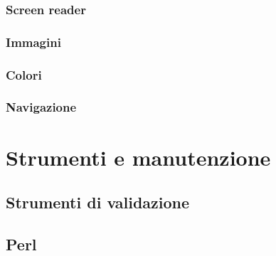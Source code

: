 		\subsubsection{Screen reader}
		
		\subsubsection{Immagini}
		
		\subsubsection{Colori}
		
		\subsubsection{Navigazione}
\section{Strumenti e manutenzione} %
	\subsection{Strumenti di validazione}
	
	\subsection{Perl}
